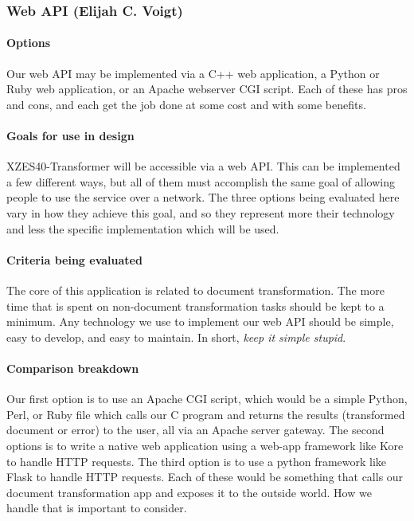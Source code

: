 \subsubsection{Web API (Elijah C. Voigt)}

\paragraph{Options}

Our web API may be implemented via a C++ web application, a Python or Ruby web application, or an Apache webserver CGI script.
Each of these has pros and cons, and each get the job done at some cost and with some benefits.

\paragraph{Goals for use in design}

XZES40-Transformer will be accessible via a web API.
This can be implemented a few different ways, but all of them must accomplish the same goal of allowing people to use the service over a network.
The three options being evaluated here vary in how they achieve this goal, and so they represent more their technology and less the specific implementation which will be used.

\paragraph{Criteria being evaluated}

The core of this application is related to document transformation.
The more time that is spent on non-document transformation tasks should be kept to a minimum.
Any technology we use to implement our web API should be simple, easy to develop, and easy to maintain.
In short, \textit{keep it simple stupid}.

\paragraph{Comparison breakdown}

Our first option is to use an Apache CGI script, which would be a simple Python, Perl, or Ruby file which calls our C program and returns the results (transformed document or error) to the user, all via an Apache server gateway.
The second options is to write a native web application using a web-app framework like Kore to handle HTTP requests.
The third option is to use a python framework like Flask to handle HTTP requests.
Each of these would be something that calls our document transformation app and exposes it to the outside world.
How we handle that is important to consider.

